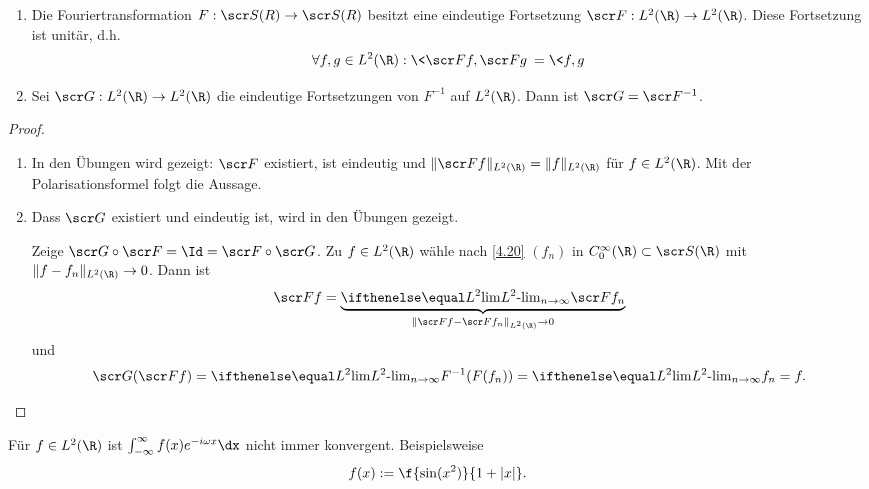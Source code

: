 \begin{st} \label{4.21}
	\begin{enumerate}[1)]
		\item
			Die Fouriertransformation $F: \scr S(R) \to \scr S(R)$ besitzt eine eindeutige Fortsetzung $\scr F:L^2(\R) \to L^2(\R)$.
			Diese Fortsetzung ist unitär, d.h.
			\[
				\forall f,g \in L^2 (\R) : \<\scr F f, \scr Fg \> = \<f,g\>
			\]
		\item
			Sei $\scr G: L^2(\R) \to L^2(\R)$ die eindeutige Fortsetzungen von $F^{-1}$ auf $L^2(\R)$.
			Dann ist $\scr G = \scr F^{-1}$.
	\end{enumerate}
	\begin{proof}
		\begin{enumerate}[1)]
			\item
				In den Übungen wird gezeigt: $\scr F$ existiert, ist eindeutig und $\|\scr Ff\|_{L^2(\R)} = \|f\|_{L^2(\R)}$ für $f \in L^2(\R)$.
				Mit der Polarisationsformel folgt die Aussage.
			\item
				Dass $\scr G$ existiert und eindeutig ist, wird in den Übungen gezeigt.

				Zeige $\scr G \circ \scr F = \Id = \scr F \circ \scr G$.
				Zu $f \in L^2(\R)$ wähle nach \ref{4.20} $(f_n)$ in $C_0^\infty(\R) \subset \scr S(\R)$ mit $\|f-f_n\|_{L^2(\R)} \to 0$.
				Dann ist
				\[
					\scr F f = \underbrace{\lim[L^2]_{n\to \infty} \scr F f_n}_{\|\scr F f  - \scr F f_n\|_{L^2(\R)}\to 0}
				\]
				 und
				 \[
					\scr G(\scr F f) = \lim[L^2]_{n\to\infty} F^{-1}(F(f_n)) = \lim[L^2]_{n\to\infty} f_n = f.
				 \]
		\end{enumerate}
	\end{proof}
\end{st}

\begin{nt} \label{4.22}
	Für $f \in L^2(\R)$ ist $\int_{-\infty}^\infty f(x) e^{-i \omega x} \dx$ nicht immer konvergent.
	Beispielsweise
	\[
		f(x) :=  \f{\sin(x^2)}{1+|x|}.
	\]
\end{nt}


